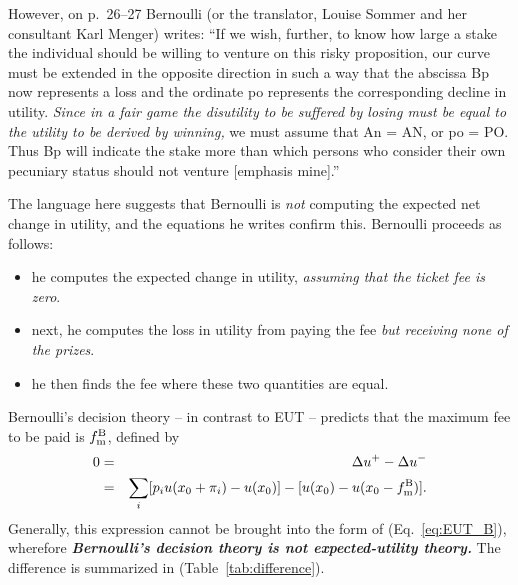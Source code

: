 \documentclass[pdftex]{article}
\newcommand{\bi}{\begin{itemize}}
\newcommand{\ei}{\end{itemize}}
\newcommand{\elabel}[1]{\label{eq:#1}}
\newcommand{\eref}[1]{(Eq.~\ref{eq:#1})}
\newcommand{\tref}[1]{(Table~\ref{tab:#1})}
\newcommand{\bea}{\begin{eqnarray}}
\newcommand{\eea}{\end{eqnarray}}
\newcommand{\Du}{\Delta u}
\newcommand{\tmb}{{f_{\text{\normalfont{m}}}^{\text{\normalfont{B}}}}}
\begin{document}
However, on p.~26--27 Bernoulli (or the translator, Louise Sommer and her consultant Karl Menger) writes:
``If we wish, further, to know how large a stake the individual should be willing to venture on this risky proposition, our curve must be extended in the opposite direction in such a way that the abscissa Bp now represents a loss and the ordinate po represents the corresponding decline in utility. {\it Since in a fair game the disutility to be suffered by losing must be equal to the utility to be derived by winning,} we must assume that An = AN, or po = PO. Thus Bp will indicate the stake more than which persons who consider their own pecuniary status should not venture [emphasis mine].''

The language here suggests that Bernoulli is {\it not} computing the expected net change in utility, and the equations he writes confirm this. Bernoulli proceeds as follows:
\bi
\item
he computes the expected change in utility, {\it assuming that the ticket fee is zero}.
\item
next, he computes the loss in utility from paying the fee {\it but receiving none of the prizes}.
\item
he then finds the fee where these two quantities are equal.  
\ei 
Bernoulli's decision theory -- in contrast to EUT -- predicts that the maximum fee to be paid is $\tmb$, defined by
\bea
0&=&\Du^+-\Du^-\\
&=&\sum_i [p_i u(x_0+\pi_i) -u(x_0)] - [ u(x_0)-u(x_0-\tmb)].
\elabel{ub}
\eea
Generally, this expression cannot be brought into the form of \eref{EUT_B}, wherefore {\it \bf Bernoulli's decision theory is not expected-utility theory.} The difference is summarized in \tref{difference}.
\end{document}
